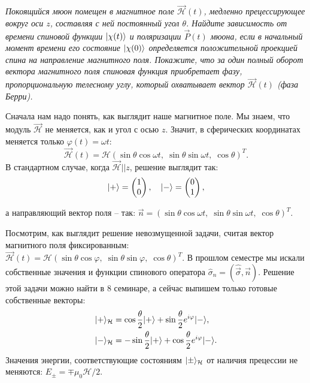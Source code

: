 \begin{exercise}
  \textit{Покоящийся мюон помещен в магнитное поле $\Vec{\mathcal{H}}(t)$,
    медленно прецессирующее вокруг оси $z$, составляя с ней постоянный угол
    $\theta$. Найдите зависимость от времени спиновой функции $\lvert\chi(t)\rangle$ и
    поляризации $\Vec{P}(t)$ мюона, если в начальный момент времени его состояние
    $\lvert\chi(0)\rangle$ определяется положительной проекцией спина на направление
    магнитного поля. Покажите, что за один полный оборот вектора магнитного поля
    спиновая функция приобретает фазу, пропорциональную телесному углу, который
    охватывает вектор $\Vec{\mathcal{H}}(t)$ (фаза Берри).}
\end{exercise}

Сначала нам надо понять, как выглядит наше магнитное поле. Мы знаем, что модуль
$\Vec{\mathcal{H}}$ не меняется, как и угол с осью $z$. Значит, в сферических
координатах меняется только $\varphi(t)=\omega t$:
\[
  \Vec{\mathcal{H}}(t) = \mathcal{H}(\sin\theta\cos\omega t, \; \sin\theta\sin\omega t, \; \cos\theta)^T.
\]
В стандартном случае, когда $\Vec{\mathcal{H}}||z$, решение выглядит так:
\[
  \lvert+\rangle=\begin{pmatrix} 1 \\ 0 \end{pmatrix}, \quad \lvert-\rangle=\begin{pmatrix} 0 \\ 1 \end{pmatrix},
\]

а направляющий вектор поля -- так: $\Vec{n}=(\sin\theta\cos\omega t, \;
  \sin\theta\sin\omega t, \; \cos\theta)^T$.

Посмотрим, как выглядит решение невозмущенной задачи, считая вектор магнитного
поля фиксированным: $\Vec{\mathcal{H}}(t) = \mathcal{H}(\sin\theta\cos\varphi,
  \; \sin\theta\sin\varphi, \; \cos\theta)^T.$ В прошлом семестре мы искали
собственные значения и функции спинового оператора
$\hat{\sigma}_n=(\hat{\Vec{\sigma}},\Vec{n})$. Решение этой задачи можно найти
в 8 семинаре, а сейчас выпишем только готовые собственные векторы:
\begin{align*}
  \lvert+\rangle_{\mathcal{H}} &= \cos\frac{\theta}{2}\lvert+\rangle+\sin\frac{\theta}{2}e^{i\varphi}\lvert-\rangle, \\
  \lvert-\rangle_{\mathcal{H}} &= -\sin\frac{\theta}{2}\lvert+\rangle+\cos\frac{\theta}{2}e^{i\varphi}\lvert-\rangle.
\end{align*}
Значения энергии, соответствующие состояниям $\lvert\pm\rangle_{\mathcal{H}}$ от
наличия прецессии не меняются: $E_{\pm}=\mp\mu_0\mathcal{H}/2$.

